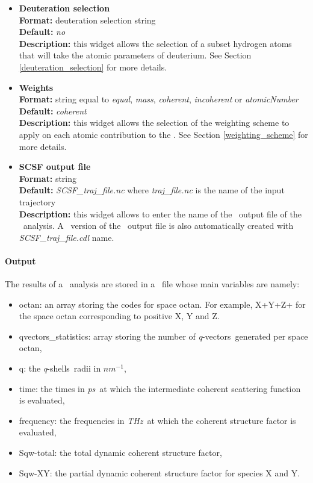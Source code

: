 \documentclass[a4paper,11pt]{report}
\newcommand{\ps}{\textit{ps}}
\newcommand{\invnm}{$nm^{-1}$}
\newcommand{\thz}{\textit{THz}}
\newcommand{\qvects}{\textit{q}-vectors}
\newcommand{\qshells}{\textit{q}-shells}
\begin{document}
\begin{itemize}
\item \textbf{Deuteration selection}\\
\textbf{Format:} deuteration selection string\\
\textbf{Default:} \textit{no}\\
\textbf{Description:} this widget allows the selection of a subset hydrogen atoms that will take the atomic parameters 
of deuterium. See Section \ref{deuteration_selection} for more details.

\item \textbf{Weights}\\
\textbf{Format:} string equal to \textit{equal}, \textit{mass}, \textit{coherent}, \textit{incoherent} or \textit{atomicNumber}\\
\textbf{Default:} \textit{coherent}\\
\textbf{Description:} this widget allows the selection of the weighting scheme to apply on each atomic contribution 
to the \SCSF . See Section \ref{weighting_scheme} for more details. 

\item \textbf{SCSF output file}\\
\textbf{Format:} string\\
\textbf{Default:} \textit{SCSF\_traj\_file.nc} where \textit{traj\_file.nc} is the name of the input trajectory\\
\textbf{Description:} this widget allows to enter the name of the \NetCDF\ output file of the \SCSF\ analysis. A \CDL\ 
version of the \NetCDF\ output file is also automatically created with \textit{SCSF\_traj\_file.cdl} name.
\end{itemize}

\paragraph{Output\\}
The results of a \SCSF\ analysis are stored in a \NetCDF\ file whose main variables are namely:
\begin{itemize}
\item octan: an array storing the codes for space octan. For example, X+Y+Z+ for the space octan corresponding to positive
X, Y and Z.
\item qvectors\_statistics: array storing the number of \qvects\ generated per space octan,
\item q: the \qshells\ radii in \invnm ,
\item time: the times in \ps\ at which the intermediate coherent scattering function is evaluated,
\item frequency: the frequencies in \thz\ at which the coherent structure factor is evaluated,
\item Sqw-total: the total dynamic coherent structure factor,
\item Sqw-XY: the partial dynamic coherent structure factor for species X and Y.
\end{itemize}
\end{document}
